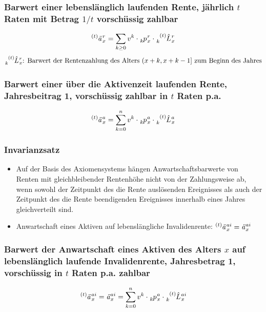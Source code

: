 \documentclass[12pt]{report}
\theoremstyle{dotless}
\theoremstyle{definition}
\begin{document}
\subsubsection{Barwert einer lebenslänglich laufenden Rente, jährlich $t$ Raten mit Betrag $1/t$ vorschüssig zahlbar}
\begin{equation}
	\tensor[^{(t)}]{\text{\textit{ä}}}{}_x^r=\sum_{k \geq 0} v^k \cdot \tensor[_{k}]{p}{}_x^r \cdot  \tensor[_{k}^{(t)}]{\hat{L}}{}_x^r
\end{equation}
\begin{equation}
	\tensor[_{k}^{(t)}]{\hat{L}}{}_x^r \text{: Barwert der Rentenzahlung des Alters } (x+k, x+k-1] \text{ zum Beginn des Jahres}
\end{equation}

\subsubsection{Barwert einer über die Aktivenzeit laufenden Rente, Jahresbeitrag 1, vorschüssig zahlbar in $t$ Raten p.a.}
\begin{equation}
	\tensor[^{(t)}]{\text{\textit{ä}}}{}_x^a=\sum_{k = 0}^n v^k \cdot \tensor[_{k}]{p}{}_x^a \cdot  \tensor[_{k}^{(t)}]{\hat{L}}{}_x^a
\end{equation}

 \subsubsection{Invarianzsatz}
 \begin{itemize}
 	\item  Auf der Basis des Axiomensystems hängen Anwartschaftsbarwerte von Renten mit gleichbleibender Rentenhöhe nicht von der Zahlungsweise ab, wenn sowohl der Zeitpunkt des die Rente auslösenden Ereignisses als auch der Zeitpunkt des die Rente beendigenden Ereignisses innerhalb eines Jahres gleichverteilt sind.
 	\item Anwartschaft eines Aktiven auf lebenslängliche Invalidenrente: $\tensor[^{(t)}]{\text{\textit{ä}}}{}_x^{ai} = \text{\textit{ä}}_x^{ai}$
 \end{itemize}

\subsubsection{Barwert der Anwartschaft eines Aktiven des Alters $x$ auf lebenslänglich laufende Invalidenrente, Jahresbetrag 1, vorschüssig in $t$ Raten p.a. zahlbar}
\begin{equation}
	\tensor[^{(t)}]{\text{\textit{ä}}}{}_x^{ai}=\text{\textit{ä}}_x^{ai}=\sum_{k = 0}^n v^k \cdot \tensor[_{k}]{p}{}_x^a \cdot  \tensor[_{k}^{(t)}]{\hat{L}}{}_x^{ai}
\end{equation}
\end{document}
